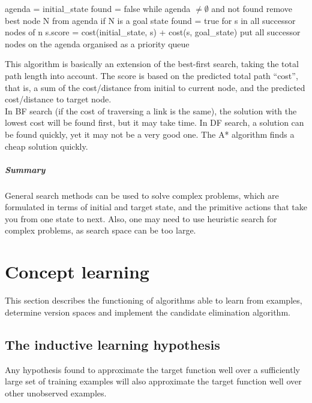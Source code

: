 \begin{algorithm}[caption={A*.}, label={alg6}]
agenda = {initial_state}
found = false
while agenda $\neq \emptyset$ and not found
    remove best node N from agenda
    if N is a goal state
        found = true
    for s in all successor nodes of n
        s.score  = cost(initial_state, s) + cost(s, goal_state)
    put all successor nodes on the agenda organised as a priority queue
\end{algorithm}
This algorithm is basically an extension of the best-first search, taking the total path length into account. The score is based on the predicted total path “cost”, that is, a sum of the cost/distance from initial to current node, and the predicted cost/distance to target node.\\
\linebreak
In BF search (if the cost of traversing a link is the same), the solution with the lowest cost will be found first, but it may take time. In DF search, a solution can be found quickly, yet it may not be a very good one. The A* algorithm finds a cheap solution quickly.

\paragraph{Summary} General search methods can be used to solve
complex problems, which are formulated in terms of initial and target state, and the primitive actions that take you from one state to next. Also, one may need to use heuristic search for complex problems, as search space can be too large.


\chapter{Concept learning}
This section describes the functioning of algorithms able to learn from examples, determine version spaces and implement the candidate elimination algorithm.
\section{The inductive learning hypothesis} Any hypothesis found to approximate the target function well over a sufficiently large set of training examples will also approximate the target function well over other unobserved examples.

